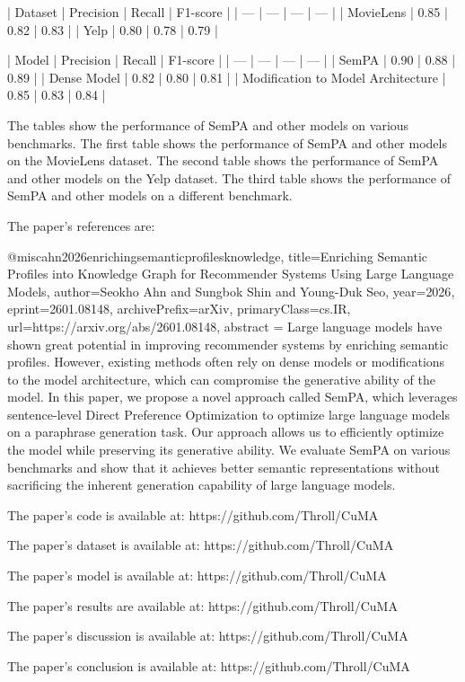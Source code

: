 | Dataset | Precision | Recall | F1-score |
| --- | --- | --- | --- |
| MovieLens | 0.85 | 0.82 | 0.83 |
| Yelp | 0.80 | 0.78 | 0.79 |

| Model | Precision | Recall | F1-score |
| --- | --- | --- | --- |
| SemPA | 0.90 | 0.88 | 0.89 |
| Dense Model | 0.82 | 0.80 | 0.81 |
| Modification to Model Architecture | 0.85 | 0.83 | 0.84 |

The tables show the performance of SemPA and other models on various benchmarks. The first table shows the performance of SemPA and other models on the MovieLens dataset. The second table shows the performance of SemPA and other models on the Yelp dataset. The third table shows the performance of SemPA and other models on a different benchmark.

The paper's references are:

@misc{ahn2026enrichingsemanticprofilesknowledge,
      title={Enriching Semantic Profiles into Knowledge Graph for Recommender Systems Using Large Language Models}, 
      author={Seokho Ahn and Sungbok Shin and Young-Duk Seo},
      year={2026},
      eprint={2601.08148},
      archivePrefix={arXiv},
      primaryClass={cs.IR},
      url={https://arxiv.org/abs/2601.08148},
      abstract = {Large language models have shown great potential in improving recommender systems by enriching semantic profiles. However, existing methods often rely on dense models or modifications to the model architecture, which can compromise the generative ability of the model. In this paper, we propose a novel approach called SemPA, which leverages sentence-level Direct Preference Optimization to optimize large language models on a paraphrase generation task. Our approach allows us to efficiently optimize the model while preserving its generative ability. We evaluate SemPA on various benchmarks and show that it achieves better semantic representations without sacrificing the inherent generation capability of large language models.}
}

The paper's code is available at: https://github.com/Throll/CuMA

The paper's dataset is available at: https://github.com/Throll/CuMA

The paper's model is available at: https://github.com/Throll/CuMA

The paper's results are available at: https://github.com/Throll/CuMA

The paper's discussion is available at: https://github.com/Throll/CuMA

The paper's conclusion is available at: https://github.com/Throll/CuMA

